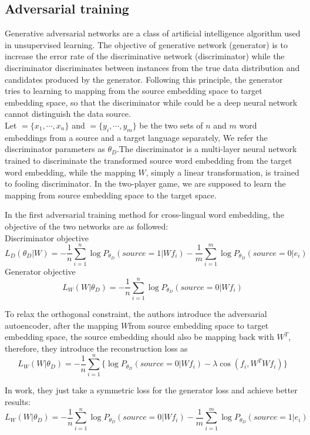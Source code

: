 \subsection{Adversarial training}
Generative adversarial networks are a class of artificial intelligence algorithm used in unsupervised learning. The objective of generative network (generator) is to increase the error rate of the discriminative network (discriminator) while the discriminator discriminates between instances from the true data distribution and candidates produced by the generator. 
Following this principle, the generator tries to learning to mapping from the source embedding space to target embedding space, so that the discriminator while could be a deep neural network cannot distinguish the data source. \\
Let ${=\{ x_1, \cdots, x_n\}}$ and ${ = \{ y_i, \cdots , y_m\}}$ be the two sets of $n$ and $m$ word embeddings from a source and a target language separately, We refer the discriminator parameters as ${\theta_D}$.The discriminator is a multi-layer neural network trained to discriminate the transformed source word embedding from the target word embedding, while the mapping $W$, simply a linear transformation, is trained to fooling discriminator. In the two-player game, we are supposed to learn the mapping from source embedding space to the target space.

In the first adversarial training method for cross-lingual word embedding, the objective of the two networks are as followed:\\
Discriminator objective  
\[ L_D(\theta_D | W) =  -\frac{1}{n} \sum_{i=1}^{n} \log P_{\theta_D}(source = 1| Wf_i) - \frac{1}{m} \sum_{i=1}^{m} \log P_{\theta_D}(source=0| e_i) \]	
Generator objective 
\[ L_W(W|\theta_D) =  -\frac{1}{n} \sum_{i=1}^{n}\log P_{\theta_D}(source=0|W f_i)  \]

To relax the orthogonal constraint, the authors introduce the adversarial autoencoder, after the mapping $W $from source embedding space to target embedding space, the source embedding should also be mapping back with $W^T$, therefore, they introduce the reconstruction loss as 
\[ L_W(W|\theta_D) =  -\frac{1}{n} \sum_{i=1}^{n} \{\log P_{\theta_D}(source=0|W f_i) -  \lambda \cos (f_i, W^T W f_i)\}\]

In \cite{conneau2017word} work, they just take a symmetric loss for the generator loss and achieve better results:
\[ L_W(W|\theta_D) =  -\frac{1}{n} \sum_{i=1}^{n}\log P_{\theta_D}(source=0|W f_i) - \frac{1}{m} \sum_{i=1}^{m} \log P_{\theta_D}(source = 1 | e_i) \]





